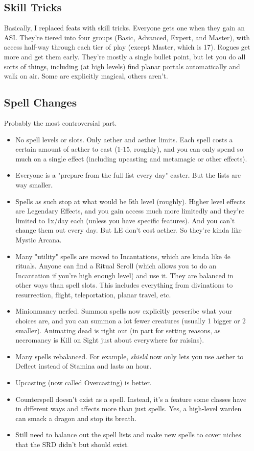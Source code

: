 \subsection*{Skill Tricks}
Basically, I replaced feats with skill tricks. Everyone gets one when they gain an ASI. They're tiered into four groups (Basic, Advanced, Expert, and Master), with access half-way through each tier of play (except Master, which is 17). Rogues get more and get them early. They're mostly a single bullet point, but let you do all sorts of things, including (at high levels) find planar portals automatically and walk on air. Some are explicitly magical, others aren't.
\subsection*{Spell Changes}
Probably the most controversial part.
\begin{itemize}
    \item No spell levels or slots. Only aether and aether limits. Each spell costs a certain amount of aether to cast (1-15, roughly), and you can only spend so much on a single effect (including upcasting and metamagic or other effects).
    \item Everyone is a "prepare from the full list every day" caster. But the lists are way smaller.
    \item Spells as such stop at what would be 5th level (roughly). Higher level effects are Legendary Effects, and you gain access much more limitedly and they're limited to 1x/day each (unless you have specific features). And you can't change them out every day. But LE don't cost aether. So they're kinda like Mystic Arcana.
    \item Many "utility" spells are moved to Incantations, which are kinda like 4e rituals. Anyone can find a Ritual Scroll (which allows you to do an Incantation if you're high enough level) and use it. They are balanced in other ways than spell slots. This includes everything from divinations to resurrection, flight, teleportation, planar travel, etc.
    \item Minionmancy nerfed. Summon spells now explicitly prescribe what your choices are, and you can summon a lot fewer creatures (usually 1 bigger or 2 smaller). Animating dead is right out (in part for setting reasons, as necromancy is Kill on Sight just about everywhere for raisins).
    \item Many spells rebalanced. For example, \textit{shield} now only lets you use aether to Deflect instead of Stamina and lasts an hour.
    \item Upcasting (now called Overcasting) is better.
    \item Counterspell doesn't exist as a spell. Instead, it's a feature some classes have in different ways and affects more than just spells. Yes, a high-level warden can smack a dragon and stop its breath.
		\item Still need to balance out the spell lists and make new spells to cover niches that the SRD didn't but should exist.
\end{itemize}
